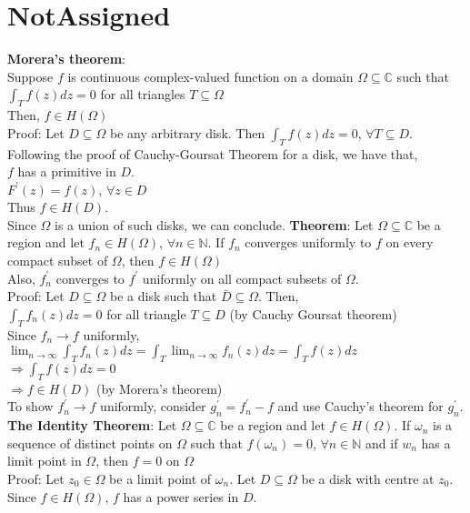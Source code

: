 \chapter{NotAssigned}
\textbf{Morera's theorem}: \\
Suppose $f$ is continuous complex-valued function on a domain $\Omega\subseteq \mathbb{C}$ such that \\
$\int_{T}^{} f(z) dz =0$ for all triangles $T\subseteq\Omega$\\
Then, $f\in H(\Omega)$\\
Proof: Let $D\subseteq \Omega$ be any arbitrary disk. Then $\int_{T}^{} f(z) dz=0$, $\forall T\subseteq D$. Following the proof of Cauchy-Goursat Theorem for a disk, we have that,\\
$f$ has a primitive in $D$.\\
$F^{'}(z)=f(z)$, $\forall z\in D$\\
Thus $f\in H(D)$.\\
Since $\Omega$ is a union of such disks, we can conclude.
\textbf{Theorem}: Let $\Omega \subseteq \mathbb{C}$ be a region and let $f_n\in H(\Omega)$, $\forall n\in \mathbb{N}$. If $f_n$ converges uniformly to $f$ on every compact subset of $\Omega$, then $f\in H(\Omega)$\\
Also, {$f_n^{'}$} converges to $f^{'}$ uniformly on all compact subsets of $\Omega$.\\
Proof: Let $D\subseteq \Omega$ be a disk such that $\bar{D}\subseteq \Omega$. Then,\\
$\int_{T}^{} f_n(z) dz=0$ for all triangle $T\subseteq D$ (by Cauchy Goursat theorem)\\
Since $f_n \rightarrow f$ uniformly,\\
$\lim_{n \to \infty} \int_{T}^{} f_n(z) dz = \int_{T}^{}\lim_{n \to \infty} f_n(z) dz = \int_{T}^{} f(z) dz$\\
$\Rightarrow \int_{T}^{} f(z) dz=0$ \\
$\Rightarrow f\in H(D)$ (by Morera's theorem)\\
To show $f_n^{'}\rightarrow f$ uniformly, consider $g_n^{'}=f_n^{'}-f$ and use Cauchy's theorem for $g_n^{'}$.\\
\textbf{The Identity Theorem}: Let $\Omega \subseteq \mathbb{C}$ be a region and let $f\in H(\Omega)$. If {$\omega_n$} is a sequence of distinct points on $\Omega$ such that $f(\omega_n)=0$, $\forall n\in \mathbb{N}$ and if {$w_n$} has a limit point in $\Omega$, then $f=0$ on $\Omega$\\
Proof: Let $z_0\in \Omega$ be a limit point of {$\omega_n$}. Let $D\subseteq \Omega$ be a disk with centre at $z_0$. Since $f\in H(\Omega)$, $f$ has a power series in $D$.\\
